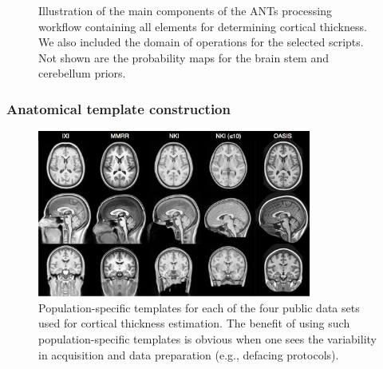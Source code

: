 \begin{figure}
  \centering
  \caption{Illustration of the main components of the ANTs processing 
  workflow containing all elements for determining cortical thickness. 
  We also included the domain of operations for the selected scripts.
  Not shown are the probability maps for the brain stem and cerebellum
  priors. {\color{blue}{All template-based prior probability maps are 
  generated prior to pipeline processing of 
  each individual subject.}}}
  \label{fig:pipeline}
\end{figure}

\subsubsection{Anatomical template construction}

\begin{figure}
  \centering
  \includegraphics[width=90mm]{Figures/templates.jpg}
  \caption{Population-specific templates for each of the four public data sets used
  for cortical thickness 
  estimation. %
  The benefit of using such population-specific templates is obvious when one sees the variability in
  acquisition and data preparation (e.g., defacing protocols).
  }
  \label{fig:template}
\end{figure}

